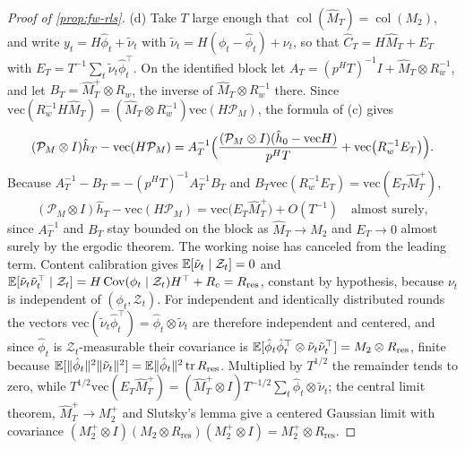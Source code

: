 \begin{proof}[Proof of \cref{prop:fw-rls}]
(d) Take $T$ large enough that $\operatorname{col}(\hat M_T)=\operatorname{col}(M_2)$, and write $y_t=H\hat\phi_t+\tilde\nu_t$ with $\tilde\nu_t=H(\phi_t-\hat\phi_t)+\nu_t$, so that $\hat C_T=H\hat M_T+E_T$ with $E_T=T^{-1}\sum_t\tilde\nu_t\hat\phi_t^\top$. On the identified block let $A_T=(p^HT)^{-1}I+\hat M_T\otimes R_w^{-1}$, and let $B_T=\hat M_T^+\otimes R_w$, the inverse of $\hat M_T\otimes R_w^{-1}$ there. Since $\mathrm{vec}(R_w^{-1}H\hat M_T)=(\hat M_T\otimes R_w^{-1})\mathrm{vec}(H\mathcal P_M)$, the formula of (c) gives
\[
(\mathcal P_M\otimes I)\hat h_T-\mathrm{vec}(H\mathcal P_M)=A_T^{-1}\Bigl(\frac{(\mathcal P_M\otimes I)(\hat h_0-\mathrm{vec}H)}{p^HT}+\mathrm{vec}\bigl(R_w^{-1}E_T\bigr)\Bigr).
\]
Because $A_T^{-1}-B_T=-(p^HT)^{-1}A_T^{-1}B_T$ and $B_T\mathrm{vec}(R_w^{-1}E_T)=\mathrm{vec}(E_T\hat M_T^+)$,
\[
(\mathcal P_M\otimes I)\hat h_T-\mathrm{vec}(H\mathcal P_M)=\mathrm{vec}\bigl(E_T\hat M_T^+\bigr)+O(T^{-1})\quad\text{almost surely},
\]
since $A_T^{-1}$ and $B_T$ stay bounded on the block as $\hat M_T\to M_2$ and $E_T\to0$ almost surely by the ergodic theorem. The working noise has canceled from the leading term. Content calibration gives $\mathbb{E}[\tilde\nu_t\mid\mathcal Z_t]=0$ and $\mathbb{E}[\tilde\nu_t\tilde\nu_t^\top\mid\mathcal Z_t]=H\operatorname{Cov}(\phi_t\mid\mathcal Z_t)H^\top+R_c=R_{\mathrm{res}}$, constant by hypothesis, because $\nu_t$ is independent of $(\phi_t,\mathcal Z_t)$. For independent and identically distributed rounds the vectors $\mathrm{vec}(\tilde\nu_t\hat\phi_t^\top)=\hat\phi_t\otimes\tilde\nu_t$ are therefore independent and centered, and since $\hat\phi_t$ is $\mathcal Z_t$-measurable their covariance is $\mathbb{E}[\hat\phi_t\hat\phi_t^\top\otimes\tilde\nu_t\tilde\nu_t^\top]=M_2\otimes R_{\mathrm{res}}$, finite because $\mathbb{E}[\lVert\hat\phi_t\rVert^2\lVert\tilde\nu_t\rVert^2]=\mathbb{E}\lVert\hat\phi_t\rVert^2\operatorname{tr} R_{\mathrm{res}}$. Multiplied by $T^{1/2}$ the remainder tends to zero, while $T^{1/2}\mathrm{vec}(E_T\hat M_T^+)=(\hat M_T^+\otimes I)T^{-1/2}\sum_t\hat\phi_t\otimes\tilde\nu_t$; the central limit theorem, $\hat M_T^+\to M_2^+$ and Slutsky's lemma give a centered Gaussian limit with covariance $(M_2^+\otimes I)(M_2\otimes R_{\mathrm{res}})(M_2^+\otimes I)=M_2^+\otimes R_{\mathrm{res}}$.
\end{proof}


